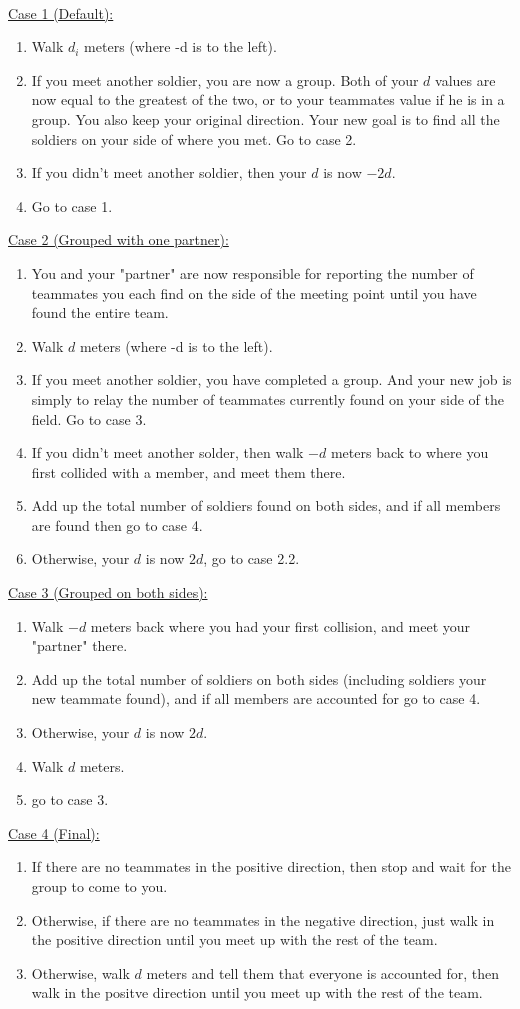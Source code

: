 \documentclass[a4paper,12pt]{article}
\begin{document}
 \\
\underline{Case 1 (Default):}
\begin{enumerate}
\item Walk \(d_i\) meters (where -d is to the left).
\item If you meet another soldier, you are now a group. Both of your \(d\) values are now equal to the
greatest of the two, or to your teammates value if he is in a group. You  also keep your original direction.
Your new goal is to find all the soldiers on your side of where you met. Go to case 2.
\item If you didn't meet another soldier, then your \(d\) is now \(-2d\).
\item Go to case 1.
\end{enumerate}
\underline{Case 2 (Grouped with one partner):}
\begin{enumerate}
\item You and your "partner" are now responsible for reporting the
  number of teammates you each find on the side of the meeting point
  until you have found the entire team.
\item Walk \(d\) meters (where -d is to the left).
\item If you meet another soldier, you have completed a group. And
  your new job is simply to relay the number of teammates currently
  found on your side of the field. Go to case 3.
\item If you didn't meet another solder, then walk \(-d\) meters back
  to where you first collided with a member, and meet them there.
\item Add up the total number of soldiers found on both sides, and if
  all members are found then go to case 4.
\item Otherwise, your \(d\) is now \(2d\), go to case 2.2.
\end{enumerate}
\underline{Case 3 (Grouped on both sides):}
\begin{enumerate}
\item Walk \(-d\) meters back where you had your first collision, and
  meet your "partner" there.
\item Add up the total number of soldiers on both sides (including
  soldiers your new teammate found), and if all members are accounted
  for go to case 4.
\item Otherwise, your \(d\) is now \(2d\).
\item Walk \(d\) meters.
\item go to case 3.
\end{enumerate}
\underline{Case 4 (Final):}
\begin{enumerate}
\item If there are no teammates in the positive direction, then stop
  and wait for the group to come to you.
\item Otherwise, if there are no teammates in the negative direction,
  just walk in the positive direction until you meet up with the rest
  of the team.
\item Otherwise, walk \(d\) meters and tell them that everyone is
  accounted for, then walk in the positve direction until you meet up
  with the rest of the team.
\end{enumerate}
\end{document}
